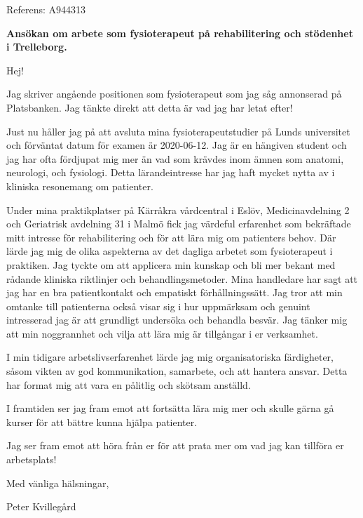 \documentclass[10pt,a4paper]{letter}
\begin{document}
 
	\begin{letter}{Referens: A944313} 
		
\opening{\textbf{Ansökan om arbete som fysioterapeut på rehabilitering och stödenhet i Trelleborg.}}
Hej!

Jag skriver angående positionen som fysioterapeut som jag såg annonserad på Platsbanken. Jag tänkte direkt att detta är vad jag har letat efter!

Just nu håller jag på att avsluta mina fysioterapeutstudier på Lunds universitet och förväntat \mbox{datum} för examen är 2020-06-12. Jag är en hängiven student och jag har ofta fördjupat mig mer än vad som krävdes inom ämnen som anatomi, neurologi, och fysiologi. Detta lärande\-intresse har jag haft mycket nytta av i kliniska resonemang om patienter.

Under mina praktikplatser på Kärråkra vårdcentral i Eslöv, Medicinavdelning 2 och Geriatrisk avdelning 31 i Malmö fick jag värdeful erfarenhet som bekräftade mitt intresse för rehabilitering och för att lära mig om patienters behov. Där lärde jag mig de olika aspekterna av det dagliga arbetet som fysioterapeut i praktiken. Jag tyckte om att applicera min kunskap och bli mer bekant med rådande kliniska riktlinjer och behandlingsmetoder. Mina handledare har sagt att jag har en bra patientkontakt och empatiskt förhållningssätt. Jag tror att min omtanke till patienterna också visar sig i hur uppmärksam och genuint intresserad jag är att grundligt undersöka och behandla besvär. Jag tänker mig att min noggrannhet och vilja att lära mig är tillgångar i er verksamhet.

I min tidigare arbetslivserfarenhet lärde jag mig organisatoriska färdigheter, såsom vikten av god kommunikation, samarbete, och att hantera ansvar. Detta har format mig att vara en pålitlig och skötsam anställd.

I framtiden ser jag fram emot att fortsätta lära mig mer och skulle gärna gå kurser för att bättre kunna hjälpa patienter.

Jag ser fram emot att höra från er för att prata mer om vad jag kan tillföra er arbetsplats!
	
\vspace{1em}
\hspace{0.1\linewidth}Med vänliga hälsningar,

\hspace{0.1\linewidth}Peter Kvillegård
		 
 
\end{letter} 
\end{document}
